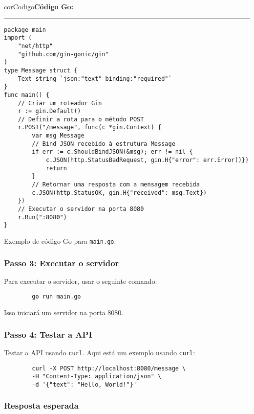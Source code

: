 \begin{listing}[!ht]
    \begin{myboxCode}{corCodigo}{\textbf{Código Go: }}\vspace{3mm}
    \hrule
    \begin{verbatim}
package main
import (
    "net/http"
    "github.com/gin-gonic/gin"
)
type Message struct {
    Text string `json:"text" binding:"required"`
}
func main() {
    // Criar um roteador Gin
    r := gin.Default()
    // Definir a rota para o método POST
    r.POST("/message", func(c *gin.Context) {
        var msg Message
        // Bind JSON recebido à estrutura Message
        if err := c.ShouldBindJSON(&msg); err != nil {
            c.JSON(http.StatusBadRequest, gin.H{"error": err.Error()})
            return
        }
        // Retornar uma resposta com a mensagem recebida
        c.JSON(http.StatusOK, gin.H{"received": msg.Text})
    })
    // Executar o servidor na porta 8080
    r.Run(":8080")
}
\end{verbatim}
\end{myboxCode}
\caption{Exemplo de código Go para \texttt{main.go}.}
\label{lst:mainGo}
\end{listing}


\subsubsection{Passo 3: Executar o servidor}

Para executar o servidor, usar o seguinte comando:

\begin{verbatim}
        go run main.go
\end{verbatim}

Isso iniciará um servidor na porta 8080.

\subsubsection{Passo 4: Testar a API}

Testar a API usando \texttt{curl}. Aqui está um exemplo usando \texttt{curl}:

\begin{verbatim}
        curl -X POST http://localhost:8080/message \
        -H "Content-Type: application/json" \
        -d '{"text": "Hello, World!"}'
\end{verbatim}

\subsubsection{Resposta esperada}

